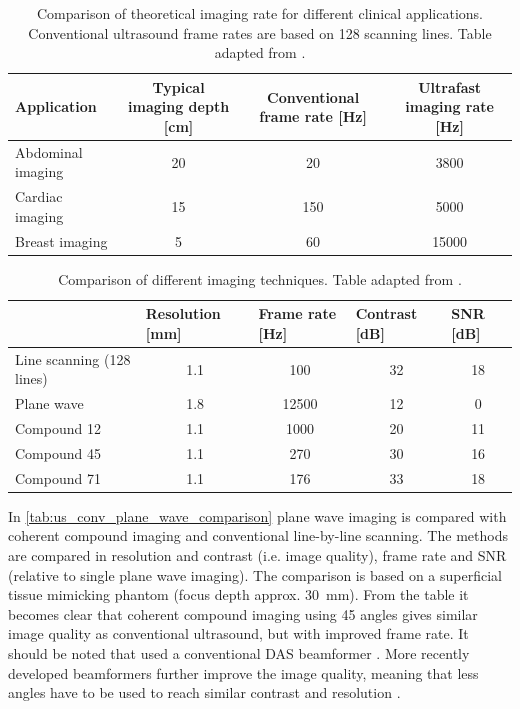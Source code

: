 \begin{table}[t]
  \centering
  \caption{Comparison of theoretical imaging rate for different clinical applications. Conventional ultrasound frame rates are based on 128 scanning lines. Table adapted from \citet{minin_ultrafast_2011}.}
    \begin{tabular}{lccc}
    \toprule
    \multicolumn{1}{p{8.18em}}{Application} & \multicolumn{1}{p{7.5em}}{Typical imaging depth [cm]} & \multicolumn{1}{p{7.5em}}{Conventional frame rate [Hz]} & \multicolumn{1}{p{8.5em}}{Ultrafast imaging rate [Hz]} \\
    \midrule
    Abdominal imaging & 20    & 20    & 3800 \\
    Cardiac imaging & 15    & 150   & 5000 \\
    Breast imaging & 5     & 60    & 15000 \\
    \bottomrule
    \end{tabular}%
  \label{tab:us_conv_plane_wave_theoretical_comp}%
\end{table}%



\begin{table}[t]
  \centering
  \caption{Comparison of different imaging techniques. Table adapted from \citet{montaldo_coherent_2009}.}
    \begin{tabular}{lcccc}
    \toprule
          & \multicolumn{1}{l}{Resolution [mm]} & \multicolumn{1}{l}{Frame rate [Hz]} & \multicolumn{1}{l}{Contrast [dB]} & \multicolumn{1}{l}{SNR [dB]} \\
    \midrule
    Line scanning (128 lines) & 1.1   & 100   & 32    & 18 \\
    Plane wave & 1.8   & 12500 & 12    & 0 \\
    Compound 12 & 1.1   & 1000  & 20    & 11 \\
    Compound 45 & 1.1   & 270   & 30    & 16 \\
    Compound 71 & 1.1   & 176   & 33    & 18 \\
    \bottomrule
    \end{tabular}%
  \label{tab:us_conv_plane_wave_comparison}%
\end{table}%

In \autoref{tab:us_conv_plane_wave_comparison} plane wave imaging is compared with coherent compound imaging and conventional line-by-line scanning. The methods are compared in resolution and contrast (i.e. image quality), frame rate and SNR (relative to single plane wave imaging). The comparison is based on a superficial tissue mimicking phantom (focus depth approx. \SI{30}{\milli\meter}). From the table it becomes clear that coherent compound imaging using 45 angles gives similar image quality as conventional ultrasound, but with improved frame rate. It should be noted that \citeauthor{montaldo_coherent_2009} used a conventional DAS beamformer \cite{montaldo_coherent_2009}. More recently developed beamformers further improve the image quality, meaning that less angles have to be used to reach similar contrast and resolution \cite{chen_improved_2018}.




